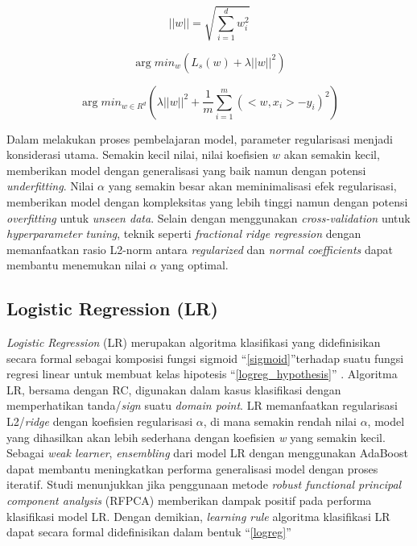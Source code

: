 \documentclass[conference]{IEEEtran}
\begin{document}
\begin{equation}
    ||w|| = \sqrt{\sum_{i=1}^{d} w_i^2} \label{l2_norm}
\end{equation}

\begin{equation}
    \arg min _{w}(L_s(w) + \lambda ||w||^2) \label{tikhonov}
\end{equation}

\begin{equation}
    \arg min_{w \in R^d} (\lambda||w||^2 + \frac{1}{m}\sum_{i=1}^{m}(<w, x_i> - y_i)^2) \label{ridgeregression}
\end{equation}

Dalam melakukan proses pembelajaran model, parameter regularisasi menjadi konsiderasi utama. Semakin kecil nilai, nilai 
koefisien $w$ akan semakin kecil, memberikan model dengan generalisasi yang baik namun dengan potensi \textit{underfitting}. 
Nilai $\alpha$ yang semakin besar akan meminimalisasi efek regularisasi, memberikan model dengan kompleksitas yang lebih tinggi 
namun dengan potensi \textit{overfitting} untuk \textit{unseen data}. Selain dengan menggunakan \textit{cross-validation} untuk \textit{hyperparameter tuning}, teknik seperti 
\textit{fractional ridge regression} \cite{b13} dengan memanfaatkan rasio L2-norm antara \textit{regularized} dan \textit{normal coefficients} dapat membantu menemukan 
nilai $\alpha$ yang optimal.

\subsection{Logistic Regression (LR)}

\textit{Logistic Regression} (LR) merupakan algoritma klasifikasi yang didefinisikan secara formal sebagai komposisi fungsi 
sigmoid ``\eqref{sigmoid}''terhadap suatu fungsi regresi linear untuk membuat kelas hipotesis ``\eqref{logreg_hypothesis}'' \cite{b4}. Algoritma LR, bersama dengan RC, digunakan dalam kasus klasifikasi 
dengan memperhatikan tanda/\textit{sign} suatu \textit{domain point}\cite{b9}. LR memanfaatkan regularisasi L2/\textit{ridge} dengan koefisien regularisasi 
$\alpha$, di mana semakin rendah nilai $\alpha$, model yang dihasilkan akan lebih sederhana dengan koefisien \textit{w} yang semakin kecil. 
Sebagai \textit{weak learner}, \textit{ensembling} dari model LR dengan menggunakan AdaBoost dapat membantu meningkatkan performa generalisasi model 
dengan proses iteratif.  Studi \cite{b14} menunjukkan jika penggunaan metode \textit{robust functional principal component analysis} (RFPCA) 
memberikan dampak positif pada performa klasifikasi model LR. Dengan demikian, \textit{learning rule} algoritma klasifikasi LR dapat secara formal didefinisikan dalam bentuk ``\eqref{logreg}''
\end{document}
